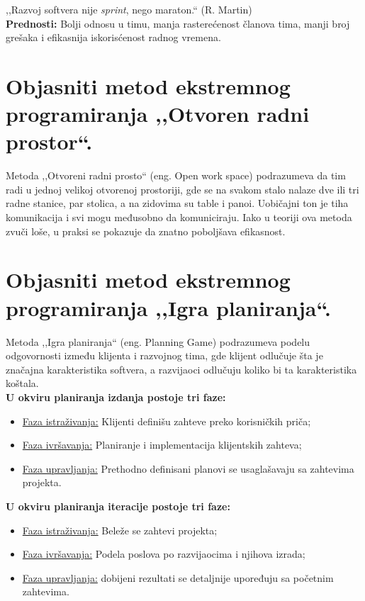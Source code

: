 \documentclass[a4paper]{article}
\begin{document}
  ,,Razvoj softvera nije \textit{sprint}, nego maraton.``  (R. Martin)\\

  \textbf{Prednosti:} Bolji odnosu u timu, manja rasterećenost članova tima, manji broj grešaka i
  efikasnija iskorisćenost radnog vremena.

\section{Objasniti metod ekstremnog programiranja ,,Otvoren radni prostor``.}
  Metoda ,,Otvoreni radni prosto`` (eng. Open work space) podrazumeva da tim radi u jednoj
  velikoj otvorenoj prostoriji, gde se na svakom stalo nalaze dve ili tri radne stanice, 
  par stolica, a na zidovima su table i panoi. Uobičajni ton je tiha komunikacija i svi mogu
  međusobno da komuniciraju. Iako u teoriji ova metoda zvuči loše, u praksi se pokazuje da znatno 
  poboljšava efikasnost.

\section{Objasniti metod ekstremnog programiranja ,,Igra planiranja``.}
  Metoda ,,Igra planiranja`` (eng. Planning Game) podrazumeva podelu odgovornosti između klijenta
  i razvojnog tima, gde klijent odlučuje šta je značajna karakteristika softvera, a razvijaoci
  odlučuju koliko bi ta karakteristika koštala. \\
  \textbf{U okviru planiranja izdanja postoje tri faze:}
  \begin{itemize}
    \item \underline{Faza istraživanja:} Klijenti definišu zahteve preko korisničkih priča;
    \item \underline{Faza ivršavanja:} Planiranje i implementacija klijentskih zahteva;
    \item \underline{Faza upravljanja:} Prethodno definisani planovi se usaglašavaju sa zahtevima projekta.
  \end{itemize}
  \textbf{U okviru planiranja iteracije postoje tri faze:}
  \begin{itemize}
    \item \underline{Faza istraživanja:} Beleže se zahtevi projekta;
    \item \underline{Faza ivršavanja:} Podela poslova po razvijaocima i njihova izrada;
    \item \underline{Faza upravljanja:} dobijeni rezultati se detaljnije upoređuju sa početnim zahtevima.
  \end{itemize}
\end{document}
